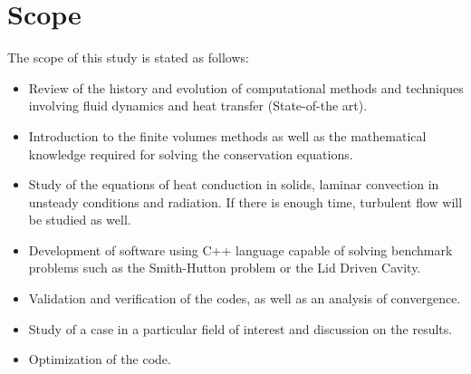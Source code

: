\section{Scope}
The scope of this study is stated as follows:
\begin{itemize}
\item Review of the history and evolution of computational methods and techniques involving fluid dynamics and heat transfer (State-of-the art).
\item Introduction to the finite volumes methods as well as the mathematical knowledge required for solving the conservation equations.
\item Study of the equations of heat conduction in solids, laminar convection in unsteady conditions and radiation. If there is enough time, turbulent flow will be studied as well. 
\item Development of software using C++ language capable of solving benchmark problems such as the Smith-Hutton problem or the Lid Driven Cavity.
\item Validation and verification of the codes, as well as an analysis of convergence.
\item Study of a case in a particular field of interest and discussion on the results.
\item Optimization of the code.
\end{itemize}